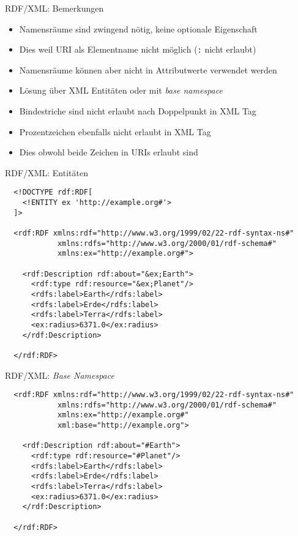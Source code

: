 \documentclass{beamer}
\begin{document}
\begin{frame}{RDF/XML: Bemerkungen}
	
	\begin{itemize}
		\item Namensräume sind zwingend nötig, keine optionale Eigenschaft
		\item Dies weil URI als Elementname nicht möglich (\texttt{:} nicht erlaubt)
		\item Namensräume können aber nicht in Attributwerte verwendet werden
		\item Lösung über XML Entitäten oder mit \emph{base namespace}
		\item Bindestriche sind nicht erlaubt nach Doppelpunkt in XML Tag
		\item Prozentzeichen ebenfalls nicht erlaubt in XML Tag
		\item Dies obwohl beide Zeichen in URIs erlaubt sind
	\end{itemize}
	
\end{frame}

\begin{frame}[fragile]{RDF/XML: Entitäten}
	
	\small
	\begin{lstlisting}
  <!DOCTYPE rdf:RDF[
    <!ENTITY ex 'http://example.org#'>
  ]>
  
  <rdf:RDF xmlns:rdf="http://www.w3.org/1999/02/22-rdf-syntax-ns#"
            xmlns:rdfs="http://www.w3.org/2000/01/rdf-schema#"
            xmlns:ex="http://example.org#">
	
    <rdf:Description rdf:about="&ex;Earth">
      <rdf:type rdf:resource="&ex;Planet"/>
      <rdfs:label>Earth</rdfs:label>
      <rdfs:label>Erde</rdfs:label>
      <rdfs:label>Terra</rdfs:label>
      <ex:radius>6371.0</ex:radius>
    </rdf:Description>
	
  </rdf:RDF>		
	\end{lstlisting}
	
\end{frame}

\begin{frame}[fragile]{RDF/XML: \emph{Base Namespace}}
	
	\small
	\begin{lstlisting}
  <rdf:RDF xmlns:rdf="http://www.w3.org/1999/02/22-rdf-syntax-ns#"
            xmlns:rdfs="http://www.w3.org/2000/01/rdf-schema#"
            xmlns:ex="http://example.org#"
            xml:base="http://example.org">
	
    <rdf:Description rdf:about="#Earth">
      <rdf:type rdf:resource="#Planet"/>
      <rdfs:label>Earth</rdfs:label>
      <rdfs:label>Erde</rdfs:label>
      <rdfs:label>Terra</rdfs:label>
      <ex:radius>6371.0</ex:radius>
    </rdf:Description>
	
  </rdf:RDF>		
	\end{lstlisting}
	
\end{frame}
\end{document}
